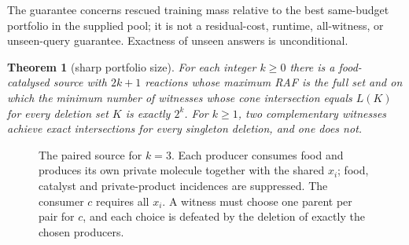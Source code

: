 \documentclass[11pt,a4paper]{article}
\theoremstyle{plain}
\newtheorem{theorem}{Theorem}[section]
\theoremstyle{definition}
\theoremstyle{remark}
\begin{document}
The guarantee concerns rescued training mass relative to the best same-budget portfolio in the supplied pool; it is not a residual-cost, runtime, all-witness, or unseen-query guarantee. Exactness of unseen answers is unconditional.

\begin{theorem}[sharp portfolio size]\label{thm:exponential}
For each integer $k\ge0$ there is a food-catalysed source with $2k+1$ reactions whose maximum RAF is the full set and on which the minimum number of witnesses whose cone intersection equals $L(K)$ for every deletion set $K$ is exactly $2^{k}$. For $k\ge1$, two complementary witnesses achieve exact intersections for every singleton deletion, and one does not.
\end{theorem}

\begin{figure}[t]
\centering
{}
\caption{The paired source for $k=3$. Each producer consumes food and produces its own private molecule together with the shared $x_i$; food, catalyst and private-product incidences are suppressed. The consumer $c$ requires all $x_i$. A witness must choose one parent per pair for $c$, and each choice is defeated by the deletion of exactly the chosen producers.}
\label{fig:paired}
\end{figure}
\end{document}
